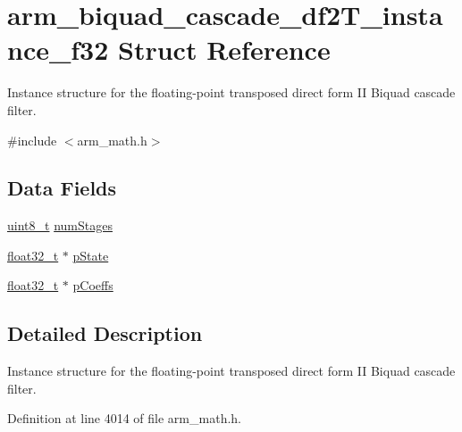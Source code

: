 \hypertarget{structarm__biquad__cascade__df2_t__instance__f32}{\section{arm\-\_\-biquad\-\_\-cascade\-\_\-df2\-T\-\_\-instance\-\_\-f32 Struct Reference}
\label{structarm__biquad__cascade__df2_t__instance__f32}
}


Instance structure for the floating-\/point transposed direct form I\-I Biquad cascade filter.  




{\ttfamily \#include $<$arm\-\_\-math.\-h$>$}

\subsection*{Data Fields}
\begin{DoxyCompactItemize}
\item 
\hyperlink{stdint_8h_aba7bc1797add20fe3efdf37ced1182c5}{uint8\-\_\-t} \hyperlink{structarm__biquad__cascade__df2_t__instance__f32_a4d17958c33c3d0a905f974bac50f033f}{num\-Stages}
\item 
\hyperlink{arm__math_8h_a4611b605e45ab401f02cab15c5e38715}{float32\-\_\-t} $\ast$ \hyperlink{structarm__biquad__cascade__df2_t__instance__f32_a24d223addfd926a7177088cf2efe76b1}{p\-State}
\item 
\hyperlink{arm__math_8h_a4611b605e45ab401f02cab15c5e38715}{float32\-\_\-t} $\ast$ \hyperlink{structarm__biquad__cascade__df2_t__instance__f32_a49a24fe1b6ad3b0b26779c32d8d80b2e}{p\-Coeffs}
\end{DoxyCompactItemize}


\subsection{Detailed Description}
Instance structure for the floating-\/point transposed direct form I\-I Biquad cascade filter. 

Definition at line 4014 of file arm\-\_\-math.\-h.



